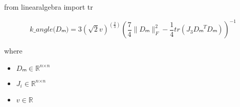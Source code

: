 \documentclass[12pt]{article}
\begin{document}
from linearalgebra import tr

\[
\textit{k\_angle(Dₘ)} = 3( \sqrt{2}\textit{v})^{(\frac{2}{3})}(\frac{7}{4}\|\textit{Dₘ}\|_F^{2} - \frac{1}{4}tr(\textit{J}_{ 3 }\textit{Dₘ}^T\textit{Dₘ}))^{-1}
\]

where
\begin{itemize}
\item $\textit{Dₘ} \in \mathbb{R}^{ \textit{n} \times \textit{n} }$
\item $\textit{J}_{\textit{i}} \in \mathbb{R}^{ \textit{n} \times \textit{n} }$
\item $\textit{v} \in \mathbb{{R}}$
\end{itemize}
\end{document}

